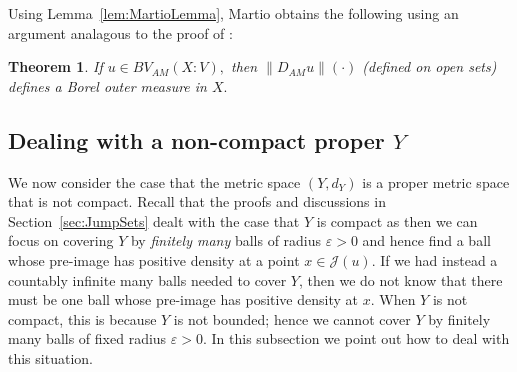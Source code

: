 \documentclass[11pt, letterpaper]{amsart} %
\newcommand*{\eps}{\varepsilon}
\numberwithin{equation}{section}
\theoremstyle{plain}
\newtheorem{theorem}[equation]{Theorem}
\theoremstyle{definition}
\begin{document}
{Using Lemma~\ref{lem:MartioLemma}, Martio obtains the following using an argument analagous to the proof of \cite[Theorem~3.4]{Miranda}:

\begin{theorem}\cite[Theorem~4.1]{Martio}
If $u\in BV_{AM}(X:V),$ then $\|D_{AM}u\|(\cdot)$ (defined on open sets) defines a Borel outer measure in $X.$
\end{theorem}



\subsection{Dealing with a non-compact proper $Y$}

We now consider the case that the metric space $(Y,d_Y)$ is a proper metric space that is not compact. Recall that the proofs
and discussions in Section~\ref{sec:JumpSets} dealt with the case that $Y$ is compact as then we can focus on covering
$Y$ by \emph{finitely many} balls of radius $\eps>0$ and hence find a ball whose pre-image has positive density at
a point $x\in \mathcal{J}(u)$. If we had instead a countably infinite many balls needed to cover $Y$, then we do not
know that there must be one ball whose pre-image has positive density at $x$. When $Y$ is not compact, this is because
$Y$ is not bounded; hence we cannot cover $Y$ by finitely many balls of fixed radius $\eps>0$. In this subsection we 
point out how to deal with this situation.

}
\end{document}

